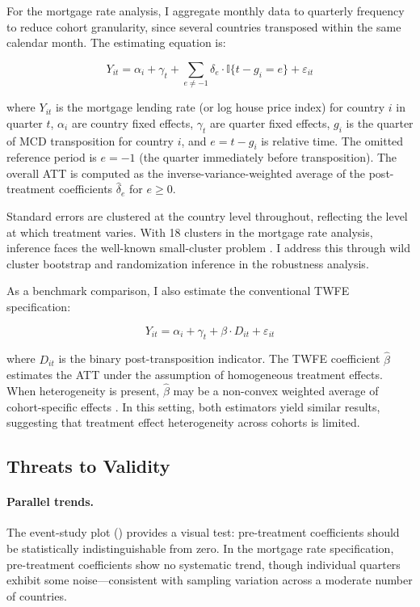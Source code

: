 \documentclass[12pt]{article}
\newcommand{\ind}{\mathbb{I}}
\begin{document}
For the mortgage rate analysis, I aggregate monthly data to quarterly frequency to reduce cohort granularity, since several countries transposed within the same calendar month. The estimating equation is:

\begin{equation}
Y_{it} = \alpha_i + \gamma_t + \sum_{e \neq -1} \delta_e \cdot \ind\{t - g_i = e\} + \varepsilon_{it}
\label{eq:sunab}
\end{equation}

\noindent where $Y_{it}$ is the mortgage lending rate (or log house price index) for country $i$ in quarter $t$, $\alpha_i$ are country fixed effects, $\gamma_t$ are quarter fixed effects, $g_i$ is the quarter of MCD transposition for country $i$, and $e = t - g_i$ is relative time. The omitted reference period is $e = -1$ (the quarter immediately before transposition). The overall ATT is computed as the inverse-variance-weighted average of the post-treatment coefficients $\hat{\delta}_e$ for $e \geq 0$.

Standard errors are clustered at the country level throughout, reflecting the level at which treatment varies. With 18 clusters in the mortgage rate analysis, inference faces the well-known small-cluster problem \citep{cameron_2008_bootstrap}. I address this through wild cluster bootstrap and randomization inference in the robustness analysis.

As a benchmark comparison, I also estimate the conventional TWFE specification:

\begin{equation}
Y_{it} = \alpha_i + \gamma_t + \beta \cdot D_{it} + \varepsilon_{it}
\label{eq:twfe}
\end{equation}

\noindent where $D_{it}$ is the binary post-transposition indicator. The TWFE coefficient $\hat{\beta}$ estimates the ATT under the assumption of homogeneous treatment effects. When heterogeneity is present, $\hat{\beta}$ may be a non-convex weighted average of cohort-specific effects \citep{goodman_bacon_2021}. In this setting, both estimators yield similar results, suggesting that treatment effect heterogeneity across cohorts is limited.

\subsection{Threats to Validity}

\paragraph{Parallel trends.} The event-study plot () provides a visual test: pre-treatment coefficients should be statistically indistinguishable from zero. In the mortgage rate specification, pre-treatment coefficients show no systematic trend, though individual quarters exhibit some noise---consistent with sampling variation across a moderate number of countries.
\end{document}

